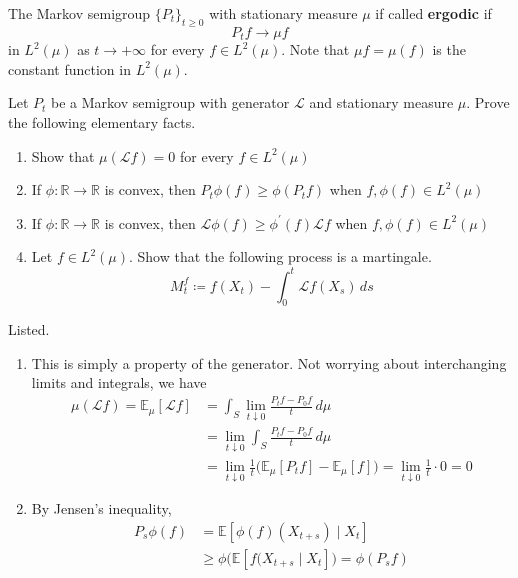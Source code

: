   \begin{definition}[Ergodicity]
  The Markov semigroup $\{P_t\}_{t \geq 0}$ with stationary measure $\mu$ if called \textbf{ergodic} if 
  \[P_t f \rightarrow \mu f\]
  in $L^2 (\mu)$ as $t \rightarrow +\infty$ for every $f \in L^2 (\mu)$. Note that $\mu f = \mu(f)$ is the constant function in $L^2 (\mu)$. 
  \end{definition}

  \begin{exercise}
  Let $P_t$ be a Markov semigroup with generator $\mathscr{L}$ and stationary measure $\mu$. Prove the following elementary facts. 
  \begin{enumerate}
      \item Show that $\mu( \mathscr{L} f) = 0$ for every $f \in L^2 (\mu)$ 
      \item If $\phi : \mathbb{R} \rightarrow \mathbb{R}$ is convex, then $P_t \phi (f) \geq \phi (P_t f)$ when $f, \phi(f) \in L^2(\mu)$ 
      \item If $\phi : \mathbb{R} \rightarrow \mathbb{R}$ is convex, then $\mathscr{L} \phi(f) \geq \phi^\prime (f) \mathscr{L} f$ when $f, \phi(f) \in L^2 (\mu)$ 
      \item Let $f \in L^2 (\mu)$. Show that the following process is a martingale. 
      \[M_t^f \coloneqq f(X_t) - \int_0^t \mathscr{L} f(X_s) \,ds\]
  \end{enumerate}
  \end{exercise}
  \begin{solution}
  Listed. 
  \begin{enumerate}
      \item This is simply a property of the generator. Not worrying about interchanging limits and integrals, we have 
      \begin{align*}
          \mu(\mathscr{L} f) = \mathbb{E}_\mu [\mathscr{L} f] & = \int_S \lim_{t \downarrow 0} \frac{P_t f - P_0 f}{t} \,d\mu \\ 
          & = \lim_{t \downarrow 0} \int_S \frac{P_t f - P_0 f}{t} \,d\mu \\
          & = \lim_{t \downarrow 0} \frac{1}{t} \big( \mathbb{E}_\mu [P_t f] - \mathbb{E}_\mu [f] \big) = \lim_{t \downarrow 0} \frac{1}{t} \cdot 0 = 0 
      \end{align*}
      
      \item By Jensen's inequality, 
      \begin{align*}
          P_s \phi(f) & = \mathbb{E} [ \phi(f) (X_{t + s}) \mid X_t] \\
          & \geq \phi \bigg( \mathbb{E}[f(X_{t + s} \mid X_t] \big) = \phi(P_s f)
      \end{align*}

  \end{enumerate}
  \end{solution}


